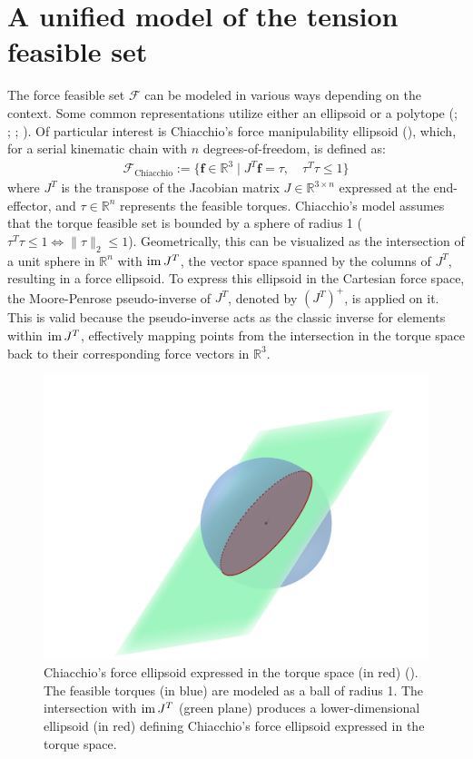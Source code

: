 \chapter{A unified model of the tension feasible set}
\label{chapter:3}

The force feasible set $\mathcal{F}$ can be modeled in various ways depending on the context. Some common representations utilize either an ellipsoid or a polytope (\cite{skuricOnLineFeasibleWrench2022}; \cite{rezzougUpperLimbIsometricForce2021b}; \cite{hernandezImprovingUpperlimbForce2017a}; \cite{bosscherWrenchfeasibleWorkspaceGeneration2006a}). Of particular interest is Chiacchio's force manipulability ellipsoid (\cite{chiacchioForcePolytopeForce1997}), which, for a serial kinematic chain with $n$ degrees-of-freedom, is defined as:
\begin{align*}
\mathcal{F}_{\text{Chiacchio}} := \{\mathbf{f}\in\mathbb{R}^3 \mid J^T\mathbf{f} = \tau,\quad \tau^T\tau\leq 1\}
\end{align*}
where $J^T$ is the transpose of the Jacobian matrix $J\in\mathbb{R}^{3\times n}$ expressed at the end-effector, and $\tau\in \mathbb{R}^n$ represents the feasible torques.  Chiacchio's model assumes that the torque feasible set is bounded by a sphere of radius 1 ($\tau^T\tau \leq 1 \iff \|\tau \|_2 \leq 1$).  Geometrically, this can be visualized as the intersection of a unit sphere in $\mathbb{R}^n$ with $\operatorname{im} J^T$, the vector space spanned by the columns of $J^T$, resulting in a force ellipsoid. To express this ellipsoid in the Cartesian force space, the Moore-Penrose pseudo-inverse of $J^T$, denoted by $(J^T)^+$, is applied on it. This is valid because the pseudo-inverse acts as the classic inverse for elements within $\operatorname{im} J^T$, effectively mapping points from the intersection in the torque space back to their corresponding force vectors in $\mathbb{R}^3$.
\begin{figure}[!htb]
 \captionsetup{justification=centering}
  \centering
  \includegraphics[trim={80 20 50 120}, clip, width=0.5\linewidth]{img/chapter_3/chiacchioellipsoid.png}
 \caption{Chiacchio's force ellipsoid expressed in the torque space (in red) (\cite{chiacchioForcePolytopeForce1997}). The feasible torques (in blue) are modeled as a ball of radius 1. The intersection with $\operatorname{im} J^T$ (green plane) produces a lower-dimensional ellipsoid (in red) defining Chiacchio's force ellipsoid expressed in the torque space.}
 \label{fig:chiacchio_ellispoid}
\end{figure}

